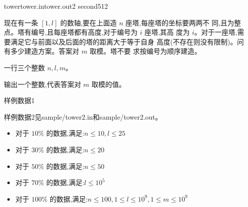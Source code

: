 \documentclass[11pt,a4paper,oneside]{article}
\begin{document}
\begin{problem}{tower}{tower.in}{tower.out}{2 second}{512}
	
	现在有一条 $[1, l]$ 的数轴,要在上面造 $n$ 座塔,每座塔的坐标要两两不
	同,且为整点。塔有编号,且每座塔都有高度,对于编号为 $i$ 座塔,其高
	度为 $i$。对于一座塔,需要满足它与前面以及后面的塔的距离大于等于自身
	高度(不存在则没有限制)。问有多少建造方案。答案对 $m$ 取模。塔不要
	求按编号为顺序建造。
	
	\InputFile
	
	一行三个整数 $n, l, m$。
	
	\OutputFile
	
	输出一个整数,代表答案对 $m$ 取模的值。
	
	\Example
	
	样例数据1
	
	\begin{example}
	\end{example}
	
	样例数据2见sample/tower2.in和sample/tower2.out。

	\Note
	\begin{itemize}
		\item 对于 $10\%$ 的数据,满足:$n \leq  10, l \leq 25$
		\item 对于 $30\%$ 的数据,满足:$n \leq 20$
		\item 对于 $50\%$ 的数据,满足:$n \leq 50$
		\item 对于 $70\%$ 的数据,满足:$l \leq 10^5$
		\item 对于 $100\%$ 的数据,满足:$n \leq 100, 1 \leq l \leq 10^9 , 1 \leq m \leq 10^9$
	\end{itemize}

\end{problem}
\end{document}
